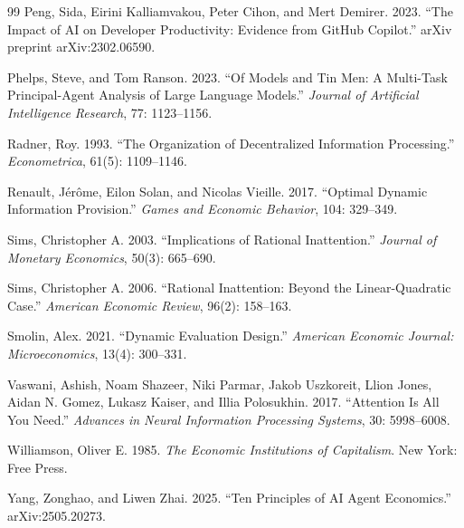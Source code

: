 \begin{thebibliography}{99}
Peng, Sida, Eirini Kalliamvakou, Peter Cihon, and Mert Demirer. 2023.
``The Impact of AI on Developer Productivity: Evidence from GitHub Copilot.''
arXiv preprint arXiv:2302.06590.

Phelps, Steve, and Tom Ranson. 2023.
``Of Models and Tin Men: A Multi-Task Principal-Agent Analysis of Large Language Models.''
\textit{Journal of Artificial Intelligence Research}, 77: 1123--1156.

Radner, Roy. 1993.
``The Organization of Decentralized Information Processing.''
\textit{Econometrica}, 61(5): 1109--1146.

Renault, J{\'e}r{\^o}me, Eilon Solan, and Nicolas Vieille. 2017.
``Optimal Dynamic Information Provision.''
\textit{Games and Economic Behavior}, 104: 329--349.

Sims, Christopher A. 2003.
``Implications of Rational Inattention.''
\textit{Journal of Monetary Economics}, 50(3): 665--690.

Sims, Christopher A. 2006.
``Rational Inattention: Beyond the Linear-Quadratic Case.''
\textit{American Economic Review}, 96(2): 158--163.

Smolin, Alex. 2021.
``Dynamic Evaluation Design.''
\textit{American Economic Journal: Microeconomics}, 13(4): 300--331.

Vaswani, Ashish, Noam Shazeer, Niki Parmar, Jakob Uszkoreit, Llion Jones, Aidan N. Gomez, Lukasz Kaiser, and Illia Polosukhin. 2017.
``Attention Is All You Need.''
\textit{Advances in Neural Information Processing Systems}, 30: 5998--6008.

Williamson, Oliver E. 1985.
\textit{The Economic Institutions of Capitalism}. New York: Free Press.

Yang, Zonghao, and Liwen Zhai. 2025.
``Ten Principles of AI Agent Economics.''
arXiv:2505.20273.

\end{thebibliography}
